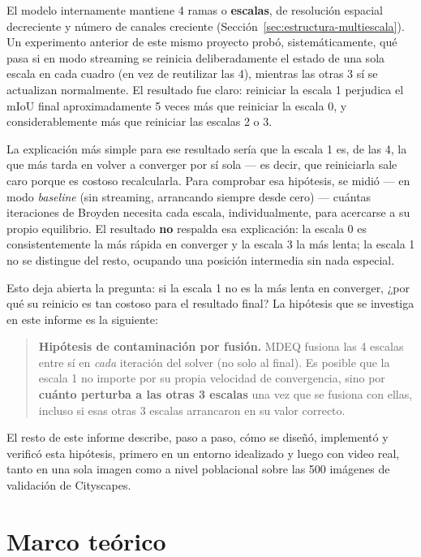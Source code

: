 \documentclass[11pt,a4paper]{article}
\begin{document}
El modelo internamente mantiene 4 ramas o \textbf{escalas}, de resolución espacial decreciente y
número de canales creciente (Sección~\ref{sec:estructura-multiescala}). Un experimento anterior de
este mismo proyecto probó, sistemáticamente, qué pasa si en modo streaming se reinicia
deliberadamente el estado de una sola escala en cada cuadro (en vez de reutilizar las 4), mientras
las otras 3 sí se actualizan normalmente. El resultado fue claro: reiniciar la escala 1 perjudica
el mIoU final aproximadamente 5 veces más que reiniciar la escala 0, y considerablemente más que
reiniciar las escalas 2 o 3.

La explicación más simple para ese resultado sería que la escala 1 es, de las 4, la que más tarda
en volver a converger por sí sola --- es decir, que reiniciarla sale caro porque es costoso
recalcularla. Para comprobar esa hipótesis, se midió --- en modo \emph{baseline} (sin streaming,
arrancando siempre desde cero) --- cuántas iteraciones de Broyden necesita cada escala,
individualmente, para acercarse a su propio equilibrio. El resultado \textbf{no} respalda esa
explicación: la escala 0 es consistentemente la más rápida en converger y la escala 3 la más
lenta; la escala 1 no se distingue del resto, ocupando una posición intermedia sin nada especial.

Esto deja abierta la pregunta: si la escala 1 no es la más lenta en converger, ¿por qué su
reinicio es tan costoso para el resultado final? La hipótesis que se investiga en este informe es
la siguiente:

\begin{quote}
\textbf{Hipótesis de contaminación por fusión.} MDEQ fusiona las 4 escalas entre sí en
\emph{cada} iteración del solver (no solo al final). Es posible que la escala 1 no importe por su
propia velocidad de convergencia, sino por \textbf{cuánto perturba a las otras 3 escalas} una vez
que se fusiona con ellas, incluso si esas otras 3 escalas arrancaron en su valor correcto.
\end{quote}

El resto de este informe describe, paso a paso, cómo se diseñó, implementó y verificó esta
hipótesis, primero en un entorno idealizado y luego con video real, tanto en una sola imagen como
a nivel poblacional sobre las 500 imágenes de validación de Cityscapes.


\section{Marco teórico}
\end{document}
